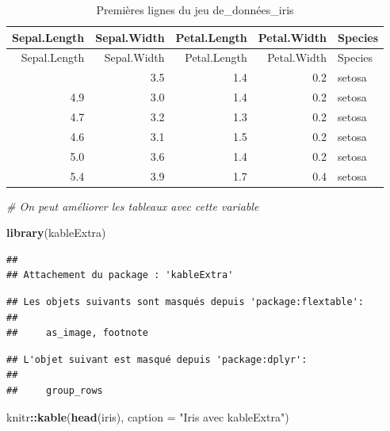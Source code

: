 \documentclass[
]{article}
\newenvironment{Shaded}{\begin{snugshade}}{\end{snugshade}}
\newcommand{\AttributeTok}[1]{\textcolor[rgb]{0.13,0.29,0.53}{#1}}
\newcommand{\CommentTok}[1]{\textcolor[rgb]{0.56,0.35,0.01}{\textit{#1}}}
\newcommand{\FunctionTok}[1]{\textcolor[rgb]{0.13,0.29,0.53}{\textbf{#1}}}
\newcommand{\NormalTok}[1]{#1}
\newcommand{\SpecialCharTok}[1]{\textcolor[rgb]{0.81,0.36,0.00}{\textbf{#1}}}
\newcommand{\StringTok}[1]{\textcolor[rgb]{0.31,0.60,0.02}{#1}}
\begin{document}
\begin{longtable}[]{@{}rrrrl@{}}
\caption{Premières lignes du jeu de\_données\_iris}\tabularnewline
\toprule\noalign{}
Sepal.Length & Sepal.Width & Petal.Length & Petal.Width & Species \\
\midrule\noalign{}
\endfirsthead
\toprule\noalign{}
Sepal.Length & Sepal.Width & Petal.Length & Petal.Width & Species \\
\midrule\noalign{}
\endhead
\bottomrule\noalign{}
\endlastfoot
5.1 & 3.5 & 1.4 & 0.2 & setosa \\
4.9 & 3.0 & 1.4 & 0.2 & setosa \\
4.7 & 3.2 & 1.3 & 0.2 & setosa \\
4.6 & 3.1 & 1.5 & 0.2 & setosa \\
5.0 & 3.6 & 1.4 & 0.2 & setosa \\
5.4 & 3.9 & 1.7 & 0.4 & setosa \\
\end{longtable}

\begin{Shaded}
\begin{Highlighting}[]
\CommentTok{\# On peut améliorer les tableaux avec cette variable}
\end{Highlighting}
\end{Shaded}

\begin{Shaded}
\begin{Highlighting}[]
\FunctionTok{library}\NormalTok{(kableExtra)}
\end{Highlighting}
\end{Shaded}

\begin{verbatim}
## 
## Attachement du package : 'kableExtra'
\end{verbatim}

\begin{verbatim}
## Les objets suivants sont masqués depuis 'package:flextable':
## 
##     as_image, footnote
\end{verbatim}

\begin{verbatim}
## L'objet suivant est masqué depuis 'package:dplyr':
## 
##     group_rows
\end{verbatim}

\begin{Shaded}
\begin{Highlighting}[]
\NormalTok{knitr}\SpecialCharTok{::}\FunctionTok{kable}\NormalTok{(}\FunctionTok{head}\NormalTok{(iris), }\AttributeTok{caption =} \StringTok{"Iris avec kableExtra"}\NormalTok{)}
\end{Highlighting}
\end{Shaded}
\end{document}
